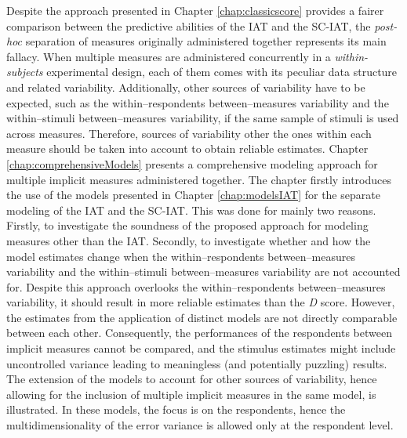 \documentclass[12pt]{book}
\begin{document}
Despite the approach presented in Chapter \ref{chap:classicscore} provides a fairer comparison between the predictive abilities of the IAT and the SC-IAT, the \emph{post-hoc} separation of measures originally administered together represents its main fallacy. 
	When multiple measures are administered concurrently in a \emph{within-subjects} experimental design, each of them comes with its peculiar data structure and related variability. 
	Additionally, other sources of variability have to be expected, such as the within--respondents between--measures variability and the within--stimuli between--measures variability, if the same sample of stimuli is used across measures.
	Therefore, sources of variability other the ones within each measure should be taken into account to obtain reliable estimates.  
	Chapter \ref{chap:comprehensiveModels} presents a comprehensive modeling approach for multiple implicit measures administered together. 
	The chapter firstly introduces the use of the models presented in Chapter \ref{chap:modelsIAT} for the separate modeling of the IAT and the SC-IAT. This was done for mainly two reasons. Firstly, to investigate the soundness of the proposed approach for modeling measures other than the IAT. Secondly, to investigate whether and how the model estimates change when the within--respondents between--measures variability and the within--stimuli between--measures variability are not accounted for. 
	Despite this approach overlooks the within--respondents between--measures variability, it should result in more reliable estimates than the \emph{D} score.
	However, the estimates from the application of distinct models are not directly comparable between each other. Consequently, the performances of the respondents between implicit measures cannot be compared, and the stimulus estimates might include uncontrolled variance leading to meaningless (and potentially puzzling) results. 
	The extension of the models to account for other sources of variability, hence allowing for the inclusion of multiple implicit measures in the same model, is illustrated. 
	In these models, the focus is on the respondents, hence the multidimensionality of the error variance is allowed only at the respondent level. 
	
\end{document}
